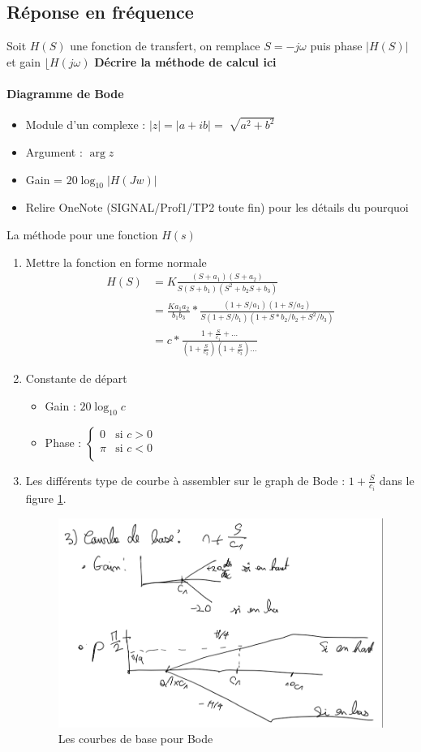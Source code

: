 \documentclass{article}
\theoremstyle{plain}%
\theoremstyle{definition}
\theoremstyle{remark}
\begin{document}
\subsection{Réponse en fréquence}
Soit $ H(S) $ une fonction de transfert, on remplace $ S = -j \omega $ puis phase $ \left| H(S) \right|  $ et gain $ \lfloor H(j \omega ) $ 
\textbf{Décrire la méthode de calcul ici}

\paragraph*{Diagramme de Bode}
\begin{itemize}
    \item Module d'un complexe : $ \left| z \right| = \left| a + ib \right| = \sqrt[]{a^2 + b^2} $ 
    \item Argument : $ \arg z $ 
    \item Gain = $ 20 \log_{10} \left| H(Jw) \right| $
    \item Relire OneNote (SIGNAL/Prof1/TP2 toute fin) pour les détails du pourquoi 
\end{itemize}
La méthode pour une fonction $ H(s) $ 
\begin{enumerate}
    \item Mettre la fonction en forme normale 
    \begin{align*}
        H(S) &= K \frac{(S + a_1)(S+a_2)}{S(S+b_1)(S^2 + b_2 S + b_3)} \\
            &= \frac{K a_1 a_2}{b_1 b_3} * \frac{(1 + S/a_1)(1+S/a_2)}{S(1+S/b_1)(1 + S*b_2/b_2 + S^2/b_3)} \\ 
            &= c * \frac{1 + \frac{S}{c_1} + \dots}{(1 + \frac{S}{c_2})(1 + \frac{S}{c_3})\dots}
    \end{align*}
    \item Constante de départ \begin{itemize}
        \item Gain : $ 20 \log_{10} c $ 
        \item Phase : $ \begin{cases}
        0 &\text{si } c>0 \\
        \pi  &\text{si }c < 0 \\
        \end{cases}  $ 
    \end{itemize} 
    \item Les différents type de courbe à assembler sur le graph de Bode : $ 1 + \frac{S}{c_i} $ dans le figure \ref{bode}.
    \begin{figure}[!htbp]
        \centering
        \includegraphics*[width=.5\textwidth]{./bode.png}
        \caption{Les courbes de base pour Bode}
        \label{bode}
    \end{figure}
\end{enumerate}
\end{document}
